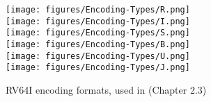 \begin{figure}[t]
\begin{centering}
    \texttt{[image: figures/Encoding-Types/R.png]}\\
    \texttt{[image: figures/Encoding-Types/I.png]}\\
    \texttt{[image: figures/Encoding-Types/S.png]}\\
    \texttt{[image: figures/Encoding-Types/B.png]}\\
    \texttt{[image: figures/Encoding-Types/U.png]}\\
    \texttt{[image: figures/Encoding-Types/J.png]}
    \caption[RV64I encoding formats]{RV64I encoding formats, used in \cite{riscv-isa}(Chapter 2.3) }
    \label{fig:rv64i_formats}
\end{centering}
\end{figure}
